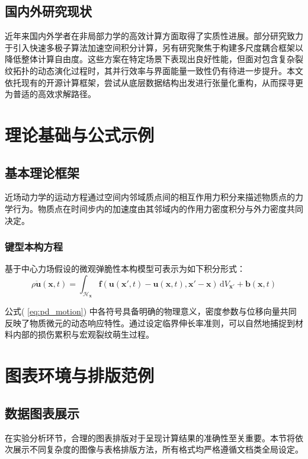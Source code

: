 \documentclass{xtu_thesis}
\begin{document}
	\subsection{国内外研究现状}
	近年来国内外学者在非局部力学的高效计算方面取得了实质性进展。部分研究致力于引入快速多极子算法加速空间积分计算，另有研究聚焦于构建多尺度耦合框架以降低整体计算自由度。这些方案在特定场景下表现出良好性能，但面对包含复杂裂纹拓扑的动态演化过程时，其并行效率与界面能量一致性仍有待进一步提升。本文依托现有的开源计算框架，尝试从底层数据结构出发进行张量化重构，从而探寻更为普适的高效求解路径。
	
	\section{理论基础与公式示例}
	
	\subsection{基本理论框架}
	近场动力学的运动方程通过空间内邻域质点间的相互作用力积分来描述物质点的力学行为。物质点在时间步内的加速度由其邻域内的作用力密度积分与外力密度共同决定。
	
	\subsubsection{键型本构方程}
	基于中心力场假设的微观弹脆性本构模型可表示为如下积分形式：
	\begin{equation}
		\rho \ddot{\boldsymbol{u}}(\boldsymbol{x}, t) = \int_{\mathcal{H}_{\boldsymbol{x}}} \boldsymbol{f}(\boldsymbol{u}(\boldsymbol{x}', t) - \boldsymbol{u}(\boldsymbol{x}, t), \boldsymbol{x}' - \boldsymbol{x}) \, \mathrm{d}V_{\boldsymbol{x}'} + \boldsymbol{b}(\boldsymbol{x}, t)
		\label{eq:pd_motion}
	\end{equation}
	
	公式( \ref{eq:pd_motion}) 中各符号具备明确的物理意义，密度参数与位移向量共同反映了物质微元的动态响应特性。通过设定临界伸长率准则，可以自然地捕捉到材料内部的损伤累积与宏观裂纹萌生过程。
	
	\section{图表环境与排版范例}
	
	\subsection{数据图表展示}
	在实验分析环节，合理的图表排版对于呈现计算结果的准确性至关重要。本节将依次展示不同复杂度的图像与表格排版方法，所有格式均严格遵循文档类全局设定。
	
\end{document}
